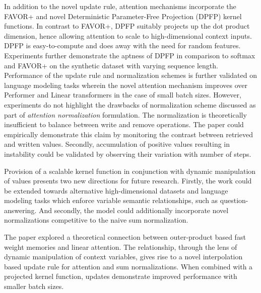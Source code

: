 \documentclass[11pt,letterpaper]{article}
\begin{document}
In addition to the novel update rule, attention mechanisms incorporate the FAVOR+ and novel Deterministic Parameter-Free Projection (DPFP) kernel functions. In contrast to FAVOR+, DPFP suitably projects up the dot product dimension, hence allowing attention to scale to high-dimensional context inputs. DPFP is easy-to-compute and does away with the need for random features. Experiments further demonstrate the aptness of DPFP in comparison to softmax and FAVOR+ on the synthetic dataset with varying sequence length. Performance of the update rule and normalization schemes is further validated on language modeling tasks wherein the novel attention mechanism improves over Performer and Linear transformers in the case of small batch sizes. However, experiments do not highlight the drawbacks of normalization scheme discussed as part of \textit{attention normalization} formulation. The normalization is theoretically insufficient to balance between write and remove operations. The paper could empirically demonstrate this claim by monitoring the contrast between retrieved and written values. Secondly, accumulation of positive values resulting in instability could be validated by observing their variation with number of steps. 

Provision of a scalable kernel function in conjunction with dynamic manipulation of values presents two new directions for future research. Firstly, the work could be extended towards alternative high-dimensional datasets and language modeling tasks which enforce variable semantic relationships, such as question-answering. And secondly, the model could additionally incorporate novel normalizations competitive to the naive sum normalization. 

The paper explored a theoretical connection between outer-product based fast weight memories and linear attention. The relationship, through the lens of dynamic manipulation of context variables, gives rise to a novel interpolation based update rule for attention and sum normalizations. When combined with a projected kernel function, updates demonstrate improved performance with smaller batch sizes. 
\end{document}
